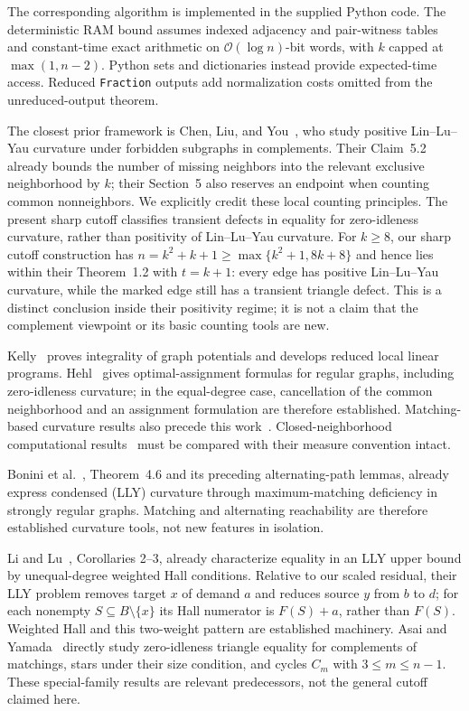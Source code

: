 \documentclass[11pt]{article}
\theoremstyle{remark}
\newcommand{\Oh}{\mathcal O}
\begin{document}
The corresponding algorithm is implemented in the supplied Python code. The deterministic RAM bound assumes indexed adjacency and pair-witness tables and constant-time exact arithmetic on $\Oh(\log n)$-bit words, with $k$ capped at $\max(1,n-2)$. Python sets and dictionaries instead provide expected-time access. Reduced \texttt{Fraction} outputs add normalization costs omitted from the unreduced-output theorem.

The closest prior framework is Chen, Liu, and You~\cite{chen}, who study positive Lin--Lu--Yau curvature under forbidden subgraphs in complements. Their Claim~5.2 already bounds the number of missing neighbors into the relevant exclusive neighborhood by $k$; their Section~5 also reserves an endpoint when counting common nonneighbors. We explicitly credit these local counting principles. The present sharp cutoff classifies transient defects in equality for zero-idleness curvature, rather than positivity of Lin--Lu--Yau curvature. For $k\ge8$, our sharp cutoff construction has $n=k^2+k+1\ge\max\{k^2+1,8k+8\}$ and hence lies within their Theorem~1.2 with $t=k+1$: every edge has positive Lin--Lu--Yau curvature, while the marked edge still has a transient triangle defect. This is a distinct conclusion inside their positivity regime; it is not a claim that the complement viewpoint or its basic counting tools are new.

Kelly~\cite{kelly} proves integrality of graph potentials and develops reduced local linear programs. Hehl~\cite{hehl} gives optimal-assignment formulas for regular graphs, including zero-idleness curvature; in the equal-degree case, cancellation of the common neighborhood and an assignment formulation are therefore established. Matching-based curvature results also precede this work~\cite{bm}. Closed-neighborhood computational results~\cite{dgm} must be compared with their measure convention intact.

Bonini et al.~\cite{bonini}, Theorem~4.6 and its preceding alternating-path lemmas, already express condensed (LLY) curvature through maximum-matching deficiency in strongly regular graphs. Matching and alternating reachability are therefore established curvature tools, not new features in isolation.

Li and Lu~\cite{lilu}, Corollaries 2--3, already characterize equality in an LLY upper bound by unequal-degree weighted Hall conditions. Relative to our scaled residual, their LLY problem removes target $x$ of demand $a$ and reduces source $y$ from $b$ to $d$; for each nonempty $S\subseteq B\setminus\{x\}$ its Hall numerator is $F(S)+a$, rather than $F(S)$. Weighted Hall and this two-weight pattern are established machinery. Asai and Yamada~\cite{asaiyamada} directly study zero-idleness triangle equality for complements of matchings, stars under their size condition, and cycles $C_m$ with $3\le m\le n-1$. These special-family results are relevant predecessors, not the general cutoff claimed here.
\end{document}
